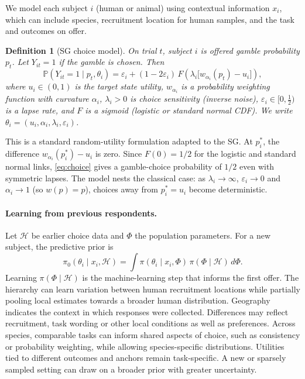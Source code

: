 \documentclass[11pt,a4paper]{article}
\newtheorem{definition}{Definition}
\newcommand{\Prob}{\mathbb{P}}
\begin{document}
We model each subject $i$ (human or animal) using contextual information $x_i$, which can include species, recruitment location for human samples, and the task and outcomes on offer.

\begin{definition}[SG choice model]
\label{def:choice}
On trial $t$, subject $i$ is offered gamble probability $p_t$. Let $Y_{it}=1$ if the gamble is chosen. Then
\begin{equation}
  \Prob(Y_{it}=1 \mid p_t,\theta_i)
  = \varepsilon_i + (1-2\varepsilon_i)\,
    F\!\left(\lambda_i\big[w_{\alpha_i}(p_t) - u_i\big]\right),
  \label{eq:choice}
\end{equation}
where $u_i\in(0,1)$ is the target state utility, $w_{\alpha_i}$ is a probability weighting function with curvature $\alpha_i$, $\lambda_i>0$ is choice sensitivity (inverse noise), $\varepsilon_i\in[0,\tfrac12)$ is a lapse rate, and $F$ is a sigmoid (logistic or standard normal CDF). We write $\theta_i=(u_i,\alpha_i,\lambda_i,\varepsilon_i)$.
\end{definition}

This is a standard random-utility formulation \citep{luce1959,hey1994} adapted to the SG. At $p_i^\ast$, the difference $w_{\alpha_i}(p_i^\ast)-u_i$ is zero. Since $F(0)=1/2$ for the logistic and standard normal links, \cref{eq:choice} gives a gamble-choice probability of $1/2$ even with symmetric lapses. The model nests the classical case: as $\lambda_i\to\infty$, $\varepsilon_i\to 0$ and $\alpha_i\to 1$ (so $w(p)=p$), choices away from $p_i^\ast=u_i$ become deterministic.

\paragraph{Learning from previous respondents.}
Let $\mathcal H$ be earlier choice data and $\Phi$ the population parameters. For a new subject, the predictive prior is
\begin{equation}
  \pi_0(\theta_i\mid x_i,\mathcal H)
  = \int \pi(\theta_i\mid x_i,\Phi)\,\pi(\Phi\mid\mathcal H)\,d\Phi.
  \label{eq:learned-prior}
\end{equation}
Learning $\pi(\Phi\mid\mathcal H)$ is the machine-learning step that informs the first offer. The hierarchy can learn variation between human recruitment locations while partially pooling local estimates towards a broader human distribution. Geography indicates the context in which responses were collected. Differences may reflect recruitment, task wording or other local conditions as well as preferences. Across species, comparable tasks can inform shared aspects of choice, such as consistency or probability weighting, while allowing species-specific distributions. Utilities tied to different outcomes and anchors remain task-specific. A new or sparsely sampled setting can draw on a broader prior with greater uncertainty.
\end{document}
